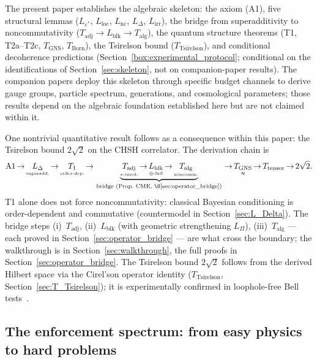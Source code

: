 \documentclass[11pt]{article}
\theoremstyle{remark}
\begin{document}
The present paper establishes the algebraic skeleton: the axiom (A1), five structural lemmas ($L_{\varepsilon^*}$, $L_{\mathrm{loc}}$, $L_{\mathrm{nc}}$, $L_\Delta$, $L_{\mathrm{irr}}$), the bridge from superadditivity to noncommutativity ($T_{\mathrm{adj}} \to L_{\mathrm{blk}} \to T_{\mathrm{alg}}$), the quantum structure theorems (T1, T2a--T2c, $T_{\mathrm{GNS}}$, $T_{\mathrm{Born}}$), the Tsirelson bound ($T_{\mathrm{Tsirelson}}$), and conditional decoherence predictions (Section~\ref{box:experimental_protocol}; conditional on the identifications of Section~\ref{sec:skeleton}, not on companion-paper results).  The companion papers deploy this skeleton through specific budget channels to derive gauge groups, particle spectrum, generations, and cosmological parameters; those results depend on the algebraic foundation established here but are not claimed within it.

One nontrivial quantitative result follows as a consequence within this paper: the Tsirelson bound $2\sqrt{2}$ on the CHSH correlator.  The derivation chain is
\[
\mathrm{A1}
\,{\to}\,
\underset{\scriptscriptstyle\text{superadd.}}{L_\Delta}
\,{\to}\,
\underset{\scriptscriptstyle\text{order-dep.}}{T_1}
\,{\to}\,
\underbrace{
\underset{\scriptscriptstyle *\text{-invol.}}{T_{\mathrm{adj}}}
\,{\to}\,
\underset{\scriptscriptstyle\text{$\oplus$-fail}}{L_{\mathrm{blk}}}
\,{\to}\,
\underset{\scriptscriptstyle\text{noncomm.}}{T_{\mathrm{alg}}}
}_{\text{\scriptsize bridge (Prop.~CME, \S\ref{sec:operator_bridge})}}
\,{\to}\,
\underset{\scriptscriptstyle\mathcal{H}}{T_{\mathrm{GNS}}}
\,{\to}\,
T_{\mathrm{tensor}}
\,{\to}\,
2\sqrt{2}.
\]
T1 alone does not force noncommutativity: classical Bayesian conditioning is order-dependent and commutative (countermodel in Section~\ref{sec:L_Delta}).  The bridge steps (i)~$T_{\mathrm{adj}}$, (ii)~$L_{\mathrm{blk}}$ (with geometric strengthening $L_\Pi$), (iii)~$T_{\mathrm{alg}}$ --- each proved in Section~\ref{sec:operator_bridge} --- are what cross the boundary; the walkthrough is in Section~\ref{sec:walkthrough}, the full proofs in Section~\ref{sec:operator_bridge}.  The Tsirelson bound $2\sqrt{2}$ follows from the derived Hilbert space via the Cirel'son operator identity ($T_{\mathrm{Tsirelson}}$, Section~\ref{sec:T_Tsirelson}); it is experimentally confirmed in loophole-free Bell tests~\cite{Hensen2015,Giustina2015}.


\subsection{The enforcement spectrum: from easy physics to hard problems}
\end{document}
